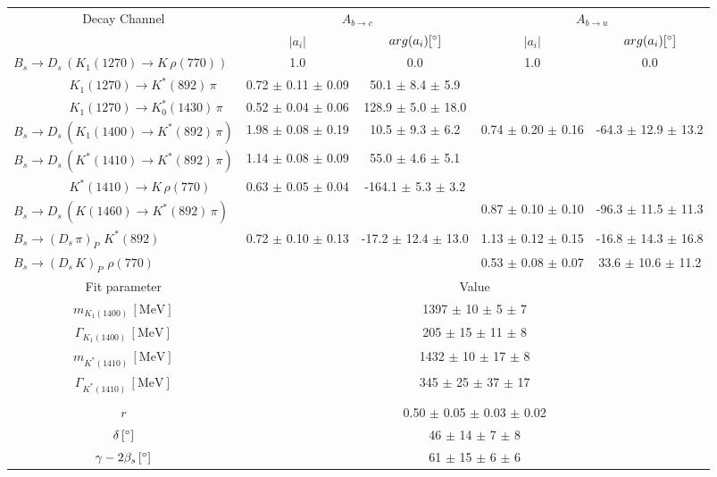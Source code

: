 \begin{tabular}{l c c c c } 
\hline
\hline
\multicolumn{1}{c}{Decay Channel} & \multicolumn{2}{c}{$A_{b \to c}$} & \multicolumn{2}{c}{$A_{b \to u}$}  \\ 
 & \multicolumn{1}{c}{$\vert a_i \vert$}  & \multicolumn{1}{c}{$arg(a_i) [^{\circ}]$}  & \multicolumn{1}{c}{$\vert a_i \vert$} & \multicolumn{1}{c}{$arg(a_i) [^{\circ}]$} \\ 
\hline
 $B_s \to D_s \, ( K_1(1270) \to K \, \rho(770) ) $ &  1.0 & 0.0 & 1.0 & 0.0  \\ 
$\phantom{B_s \to D_s \, (} K_1(1270) \to K^{*}(892) \, \pi \phantom{)} $ & 0.72 $\pm$ 0.11 $\pm$ 0.09 & 50.1 $\pm$ 8.4 $\pm$ 5.9 & &   \\ 
$\phantom{B_s \to D_s \, (} K_1(1270) \to K^{*}_{0}(1430) \, \pi \phantom{)} $ & 0.52 $\pm$ 0.04 $\pm$ 0.06 & 128.9 $\pm$ 5.0 $\pm$ 18.0 & &   \\ 
$B_s \to D_s \, ( K_1(1400) \to K^{*}(892) \, \pi ) $ & 1.98 $\pm$ 0.08 $\pm$ 0.19 & 10.5 $\pm$ 9.3 $\pm$ 6.2 & 0.74 $\pm$ 0.20 $\pm$ 0.16 & -64.3 $\pm$ 12.9 $\pm$ 13.2 \\ 
$B_s \to D_s \, ( K^{*}(1410) \to K^{*}(892) \, \pi ) $ & 1.14 $\pm$ 0.08 $\pm$ 0.09 & 55.0 $\pm$ 4.6 $\pm$ 5.1 &  &  \\ 
$\phantom{B_s \to D_s \, (} K^{*}(1410) \to K \, \rho(770) \phantom{)} $ & 0.63 $\pm$ 0.05 $\pm$ 0.04 & -164.1 $\pm$ 5.3 $\pm$ 3.2 & &   \\ 
$B_s \to D_s \, ( K(1460) \to K^{*}(892) \, \pi ) $ & & &0.87 $\pm$ 0.10 $\pm$ 0.10 & -96.3 $\pm$ 11.5 $\pm$ 11.3 \\ 
$B_s \to ( D_s \, \pi)_{P} \, \, K^{*}(892) $ & 0.72 $\pm$ 0.10 $\pm$ 0.13 & -17.2 $\pm$ 12.4 $\pm$ 13.0 & 1.13 $\pm$ 0.12 $\pm$ 0.15 & -16.8 $\pm$ 14.3 $\pm$ 16.8 \\ 
$B_s \to ( D_s \, K)_{P} \, \, \rho(770) $ & & &0.53 $\pm$ 0.08 $\pm$ 0.07 & 33.6 $\pm$ 10.6 $\pm$ 11.2 \\ 
\hline
\hline
\multicolumn{1}{c}{Fit parameter} & \multicolumn{4}{c}{Value}  \\ 
\hline
\multicolumn{1}{c}{$m_{K_1(1400)} \, [\text{MeV}]$} & \multicolumn{4}{c}{1397 $\pm$ 10 $\pm$ 5 $\pm$ 7} \\ 
\multicolumn{1}{c}{$\Gamma_{K_1(1400)} \, [\text{MeV}]$} & \multicolumn{4}{c}{205 $\pm$ 15 $\pm$ 11 $\pm$ 8} \\ 
\multicolumn{1}{c}{$m_{K^{*}(1410)} \, [\text{MeV}]$} & \multicolumn{4}{c}{1432 $\pm$ 10 $\pm$ 17 $\pm$ 8} \\ 
\multicolumn{1}{c}{$\Gamma_{K^{*}(1410)} \, [\text{MeV}]$} & \multicolumn{4}{c}{345 $\pm$ 25 $\pm$ 37 $\pm$ 17} \\ 
 \\ 
\multicolumn{1}{c}{$r$} & \multicolumn{4}{c}{0.50 $\pm$ 0.05 $\pm$ 0.03 $\pm$ 0.02} \\ 
\multicolumn{1}{c}{$\delta \, [^{\circ}]$} & \multicolumn{4}{c}{46 $\pm$ 14 $\pm$ 7 $\pm$ 8} \\ 
\multicolumn{1}{c}{$\gamma - 2 \beta_{s} \, [^{\circ}]$} & \multicolumn{4}{c}{61 $\pm$ 15 $\pm$ 6 $\pm$ 6} \\ 
\hline
\hline
\end{tabular}
